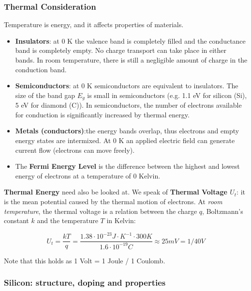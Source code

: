 \subsubsection{Thermal Consideration}

Temperature is energy, and it affects properties of materials. 

\begin{itemize}
    \item \textbf{Insulators}: at 0 K the valence band is completely filled and the conductance band is completely empty. No charge transport can take place in either bands. In room temperature, there is still a negligible amount of charge in the conduction band.
    \item \textbf{Semiconductors}: at 0 K semiconductors are equivalent to insulators. The size of the band gap $E_g$ is small in semiconductors (e.g. 1.1 eV for silicon (Si), 5 eV for diamond (C)). In semiconductors, the number of electrons available for conduction is significantly increased by thermal energy. 
    \item \textbf{Metals (conductors)}:the energy bands overlap, thus electrons and empty energy states are intermixed. At 0 K an applied electric field can generate current flow (electrons can move freely).
    \item The \textbf{Fermi Energy Level} is the difference between the highest and lowest energy of electrons at a temperature of 0 Kelvin. 
\end{itemize}

\textbf{Thermal Energy} need also be looked at. We speak of \textbf{Thermal Voltage $U_t$}: it is the mean potential caused by the thermal motion of electrons. At \textit{room temperature}, the thermal voltage is a relation between the charge $q$, Boltzmann's constant $k$ and the temperature $T$ in Kelvin: 

\begin{equation}
     U_t = \frac{kT}{q} = \frac{1.38 \cdot 10^{-23} J\cdot K^{-1} \cdot 300 K}{1.6 \cdot 10^{-19}C} \approx 25 mV = 1/40 V
\end{equation}

Note that this holds as 1 Volt = 1 Joule / 1 Coulomb.

\subsubsection{Silicon: structure, doping and properties}

